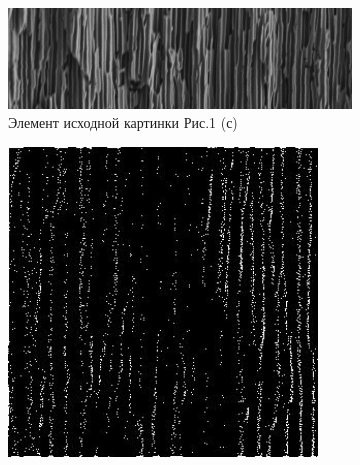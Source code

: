 \documentclass[twocolumn,10pt,russian]{/usr/lib/python3.3/site-packages/sphinx/texinputs/sphinxhowto}
\begin{document}
	\begin{figure}[h]
	\centering
		\begin{subfigure}{0.5\textwidth}
	    	\includegraphics[width = \textwidth]{PIL_Test_files/PIL_Test_26_0.jpeg}
	    \caption{Элемент исходной картинки Рис.1 (с)}
	 	\end{subfigure}
 	
 	\bigskip
    	\begin{subfigure}{0.17\textwidth}
		    \includegraphics[width=0.9\textwidth]{PIL_Test_files/PIL_Test_27_0.jpeg}
	    \end{subfigure}%
	    \begin{subfigure}{0.17\textwidth}

\end{subfigure}
\end{figure}
\end{document}
